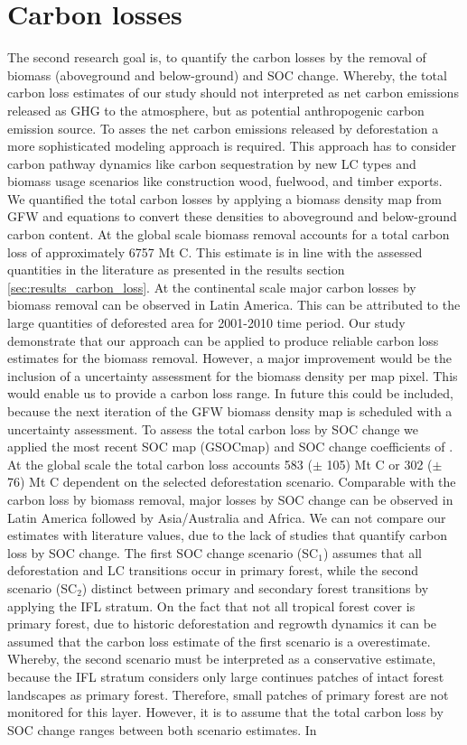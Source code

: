 	\section{Carbon losses}
		The second research goal is, to quantify the carbon losses by the removal of biomass (aboveground and below-ground) and \ac{SOC} change. Whereby, the total carbon loss estimates of our study should not interpreted as net carbon emissions released as \ac{GHG} to the atmosphere, but as potential anthropogenic carbon emission source. To asses the net carbon emissions released by deforestation a more sophisticated modeling approach is required. This approach has to consider carbon pathway dynamics like carbon sequestration by new \ac{LC} types and biomass usage scenarios like construction wood, fuelwood, and timber exports. We quantified the total carbon losses by applying a biomass density map from \ac{GFW} and equations to convert these densities to aboveground and below-ground carbon content. At the global scale biomass removal accounts for a total carbon loss of approximately 6757 Mt C. This estimate is in line with the assessed quantities in the literature as presented in the results section \ref{sec:results_carbon_loss}. At the continental scale major carbon losses by biomass removal can be observed in Latin America. This can be attributed to the large quantities of deforested area for 2001-2010 time period. Our study demonstrate that our approach can be applied to produce reliable carbon loss estimates for the biomass removal. However, a major improvement would be the inclusion of a uncertainty assessment for the biomass density per map pixel. This would enable us to provide a carbon loss range. In future this could be included, because the next iteration of the \ac{GFW} biomass density map is scheduled with a uncertainty assessment. To assess the total carbon loss by \ac{SOC} change we applied the most recent \ac{SOC} map (\ac{GSOCmap}) and \ac{SOC} change coefficients of \citet{Don2010}. At the global scale the total carbon loss accounts 583 ($\pm$ 105) Mt C or 302 ($\pm$ 76) Mt C dependent on the selected deforestation scenario. Comparable with the carbon loss by biomass removal, major losses by \ac{SOC} change can be observed in Latin America followed by Asia/Australia and Africa. We can not compare our estimates with literature values, due to the lack of studies that quantify carbon loss by \ac{SOC} change. The first \ac{SOC} change scenario (SC$_1$) assumes that all deforestation and \ac{LC} transitions occur in primary forest, while the second scenario (SC$_2$) distinct between primary and secondary forest transitions by applying the \ac{IFL} stratum. On the fact that not all tropical forest cover is primary forest, due to historic deforestation and regrowth dynamics it can be assumed that the carbon loss estimate of the first scenario is a overestimate. Whereby, the second scenario must be interpreted as a conservative estimate, because the \ac{IFL} stratum considers only large continues patches of intact forest landscapes as primary forest. Therefore, small patches of primary forest are not monitored for this layer. However, it is to assume that the total carbon loss by \ac{SOC} change ranges between both scenario estimates. In 